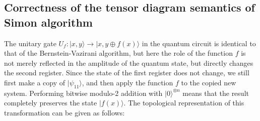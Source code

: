 \documentclass[a4paper,twocolumn,11pt,unpublished]{quantumarticle}
\numberwithin{equation}{section}
\begin{document}
\subsection{Correctness of the tensor diagram semantics of Simon algorithm}
The unitary gate $U_{f}:\vert x, y \rangle \rightarrow \vert x, y \oplus f(x) \rangle$ in the quantum circuit is identical to that of the Bernstein-Vazirani algorithm, but here the role of the function $f$ is not merely reflected in the amplitude of the quantum state, but directly changes the second register. Since the state of the first register does not change, we still first make a copy of $\vert \psi_{11} \rangle$, and then apply the function $f$ to the copied new system. Performing bitwise modulo-2 addition with ${\vert 0 \rangle}^{\otimes n}$ means that the result completely preserves the state $ \vert f(x) \rangle$. 
The topological representation of this transformation can be given as follows:
\end{document}
